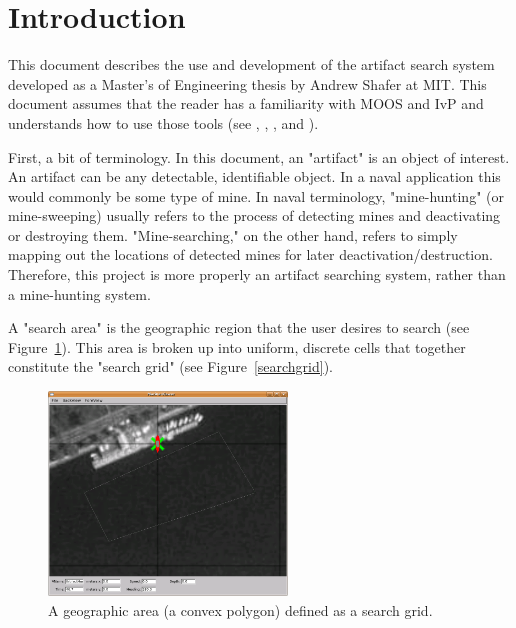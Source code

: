 \section{Introduction}
\label{intro}

This document describes the use and development of the artifact search system developed as a Master's of Engineering thesis by Andrew Shafer at MIT.  This document assumes that the reader has a familiarity with MOOS and IvP and understands how to use those tools (see \cite{new03}, \cite{ben02a}, \cite{ben03}, and \cite{ben04b}).

First, a bit of terminology.  In this document, an "artifact" is an object of interest.  An artifact can be any detectable, identifiable object.  In a naval application this would commonly be some type of mine.  In naval terminology, "mine-hunting" (or mine-sweeping) usually refers to the process of detecting mines and deactivating or destroying them.  "Mine-searching," on the other hand, refers to simply mapping out the locations of detected mines for later deactivation/destruction.  Therefore, this project is more properly an artifact searching system, rather than a mine-hunting system.

A "search area" is the geographic region that the user desires to search (see Figure~\ref{searcharea}).  This area is broken up into uniform, discrete cells that together constitute the "search grid" (see Figure~\ref{searchgrid}).

\begin{figure}[ht]
\label{searcharea}
\begin{minipage}[c]{0.5\textwidth}
  \centering \includegraphics[width=2.5in]{figures/searcharea}
\end{minipage}
\caption{A geographic area (a convex polygon) defined as a search grid.}
\end{figure}

